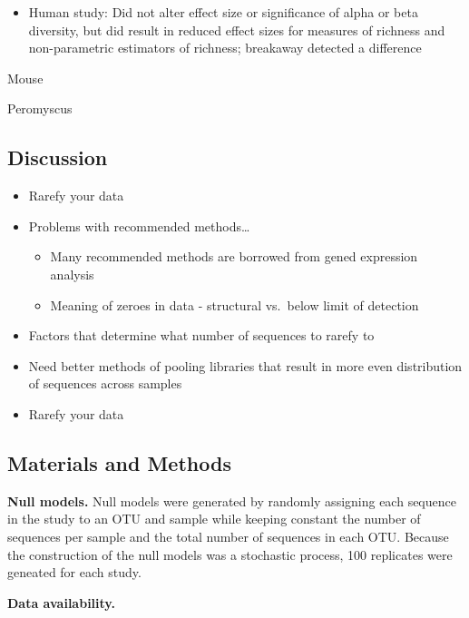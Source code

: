 \documentclass[
]{article}
\providecommand{\tightlist}{%
  \setlength{\itemsep}{0pt}\setlength{\parskip}{0pt}}
\begin{document}
\begin{itemize}
\tightlist
\item
  Human study: Did not alter effect size or significance of alpha or
  beta diversity, but did result in reduced effect sizes for measures of
  richness and non-parametric estimators of richness; breakaway detected
  a difference
\end{itemize}

Mouse

Peromyscus

\hypertarget{discussion}{%
\subsection{Discussion}\label{discussion}}

\begin{itemize}
\tightlist
\item
  Rarefy your data
\item
  Problems with recommended methods\ldots{}

  \begin{itemize}
  \tightlist
  \item
    Many recommended methods are borrowed from gened expression analysis
  \item
    Meaning of zeroes in data - structural vs.~below limit of detection
  \end{itemize}
\item
  Factors that determine what number of sequences to rarefy to
\item
  Need better methods of pooling libraries that result in more even
  distribution of sequences across samples
\item
  Rarefy your data
\end{itemize}

\hypertarget{materials-and-methods}{%
\subsection{Materials and Methods}\label{materials-and-methods}}

\textbf{Null models.} Null models were generated by randomly assigning
each sequence in the study to an OTU and sample while keeping constant
the number of sequences per sample and the total number of sequences in
each OTU. Because the construction of the null models was a stochastic
process, 100 replicates were geneated for each study.

\textbf{Data availability.}
\end{document}

